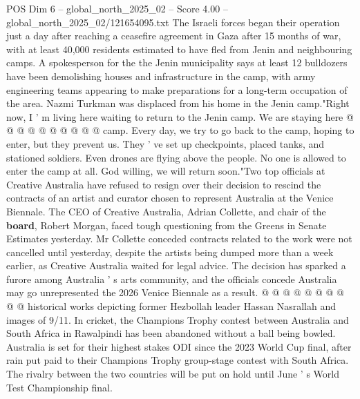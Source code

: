 \begin{textsample}{POS Dim 6 – global\_north\_2025\_02 – Score 4.00 – global\_north\_2025\_02/121654095.txt}
The Israeli forces began their operation just a day after reaching a ceasefire agreement in Gaza after 15 months of war, with at least 40,000 residents estimated to have fled from Jenin and neighbouring camps.
A spokesperson for the the Jenin municipality says at least 12 bulldozers have been demolishing houses and infrastructure in the camp, with army engineering teams appearing to make preparations for a long-term occupation of the area.
Nazmi Turkman was displaced from his home in the Jenin camp."Right now, I ' m living here waiting to return to the Jenin camp.
We are staying here @ @ @ @ @ @ @ @ @ @ camp.
Every day, we try to go back to the camp, hoping to enter, but they prevent us.
They ' ve set up checkpoints, placed tanks, and stationed soldiers.
Even drones are flying above the people.
No one is allowed to enter the camp at all.
God willing, we will return soon."Two top officials at Creative Australia have refused to resign over their decision to rescind the contracts of an artist and curator chosen to represent Australia at the Venice Biennale.
The CEO of Creative Australia, Adrian Collette, and chair of the \textbf{board}, Robert Morgan, faced tough questioning from the Greens in Senate Estimates yesterday.
Mr Collette conceded contracts related to the work were not cancelled until yesterday, despite the artists being dumped more than a week earlier, as Creative Australia waited for legal advice.
The decision has sparked a furore among Australia ' s arts community, and the officials concede Australia may go unrepresented the 2026 Venice Biennale as a result. @ @ @ @ @ @ @ @ @ @ historical works depicting former Hezbollah leader Hassan Nasrallah and images of 9/11.
In cricket, the Champions Trophy contest between Australia and South Africa in Rawalpindi has been abandoned without a ball being bowled.
Australia is set for their highest stakes ODI since the 2023 World Cup final, after rain put paid to their Champions Trophy group-stage contest with South Africa.
The rivalry between the two countries will be put on hold until June ' s World Test Championship final.

\end{textsample}
